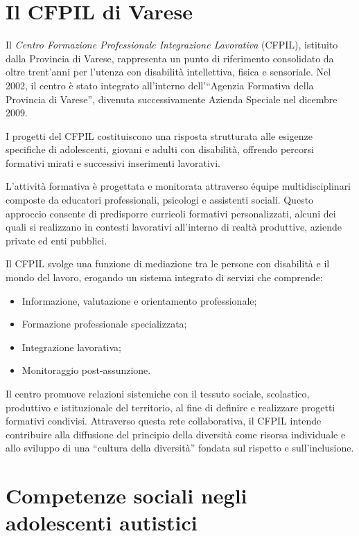 \documentclass[12pt]{report}
\begin{document}
\section{Il CFPIL di Varese}

Il \textit{Centro Formazione Professionale Integrazione Lavorativa} (CFPIL), istituito dalla Provincia di Varese, rappresenta un punto di riferimento consolidato da oltre trent'anni per l'utenza con disabilità intellettiva, fisica e sensoriale. Nel 2002, il centro è stato integrato all'interno dell'``Agenzia Formativa della Provincia di Varese'', divenuta successivamente Azienda Speciale nel dicembre 2009.

I progetti del CFPIL costituiscono una risposta strutturata alle esigenze specifiche di adolescenti, giovani e adulti con disabilità, offrendo percorsi formativi mirati e successivi inserimenti lavorativi.

L'attività formativa è progettata e monitorata attraverso équipe multidisciplinari composte da educatori professionali, psicologi e assistenti sociali. Questo approccio consente di predisporre curricoli formativi personalizzati, alcuni dei quali si realizzano in contesti lavorativi all'interno di realtà produttive, aziende private ed enti pubblici.

Il CFPIL svolge una funzione di mediazione tra le persone con disabilità e il mondo del lavoro, erogando un sistema integrato di servizi che comprende:

\begin{itemize}
    \item Informazione, valutazione e orientamento professionale;
    \item Formazione professionale specializzata;
    \item Integrazione lavorativa;
    \item Monitoraggio post-assunzione.
\end{itemize}

Il centro promuove relazioni sistemiche con il tessuto sociale, scolastico, produttivo e istituzionale del territorio, al fine di definire e realizzare progetti formativi condivisi. Attraverso questa rete collaborativa, il CFPIL intende contribuire alla diffusione del principio della diversità come risorsa individuale e allo sviluppo di una ``cultura della diversità'' fondata sul rispetto e sull'inclusione. \cite{cfpil}

\section{Competenze sociali negli adolescenti autistici}
\end{document}
